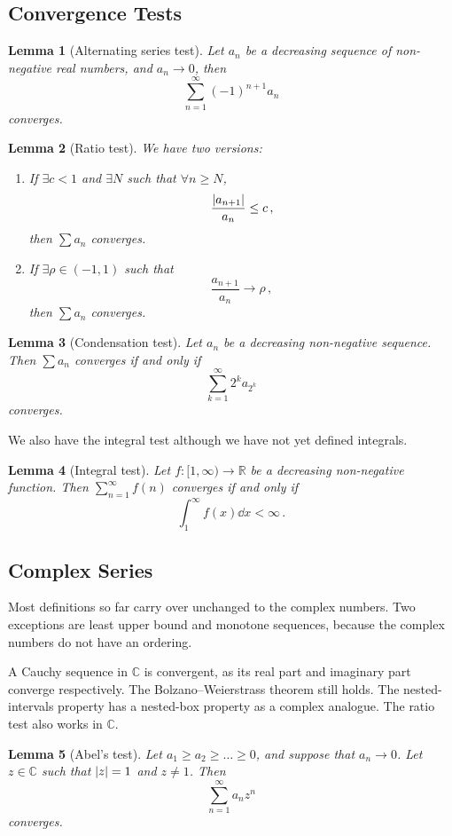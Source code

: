 \documentclass{article}
\theoremstyle{plain}\theoremheaderfont{\normalfont\itshape}\theorembodyfont{\rmfamily}\theoremseparator{.}\newtheorem*{rem}{Remark}\newtheorem*{ex}{Example}\newtheorem*{proof}{Proof}\newtheorem*{altp}{Alternative proof}
\theoremstyle{plain}\theoremheaderfont{\normalfont\bfseries}\theorembodyfont{\rmfamily}\theoremseparator{.}\newtheorem{thm}{Theorem}[section]\newtheorem{lem}[thm]{Lemma}\newtheorem{prop}[thm]{Proposition}\newtheorem*{cor}{Corollary}\newtheorem{defn}[thm]{Definition}\newtheorem{clm}[thm]{Claim}\newtheorem{clminproof}{Claim}
\theoremstyle{break}\theoremheaderfont{\normalfont\itshape}\theorembodyfont{\rmfamily}\theoremseparator{.\medskip}\newtheorem*{proofskip}{Proof}\newtheorem*{exs}{Examples}\newtheorem*{rems}{Remarks}
\theoremstyle{break}\theoremheaderfont{\normalfont\bfseries}\theorembodyfont{\rmfamily}\theoremseparator{.\medskip}\newtheorem{lemskip}[thm]{Lemma}\newtheorem{defnskip}[thm]{Definition}\newtheorem{propskip}[thm]{Proposition}\newtheorem{thmskip}[thm]{Theorem}
\begin{document}
    \subsection{Convergence Tests}
    \begin{lem}[Alternating series test]
        Let \(a_n\) be a decreasing sequence of non-negative real numbers, and \(a_n\to 0\), then
        \[\sum_{n=1}^{\infty}(-1)^{n+1}a_n\]
        converges.
    \end{lem}
    \begin{lem}[Ratio test]
        We have two versions:
        \begin{enumerate}[topsep=0pt,label=(\roman*)]
            \item If \(\exists c<1\) and \(\exists N\) such that \(\forall n\ge N\),
            \[\frac{\abs{a_{n+1}}}{a_n}\le c\,,\]
            then \(\sum a_n\) converges.
            \item If \(\exists\rho\in(-1,1)\) such that
            \[\frac{a_{n+1}}{a_n}\to\rho\,,\]
            then \(\sum a_n\) converges.
        \end{enumerate}
    \end{lem}
    \begin{lem}[Condensation test]
        Let \(a_n\) be a decreasing non-negative sequence. Then \(\sum a_n\) converges if and only if
        \[\sum_{k=1}^{\infty}2^k a_{2^k}\]
        converges. 
    \end{lem}
    We also have the integral test although we have not yet defined integrals.
    \begin{lem}[Integral test]
        Let \(f:[1,\infty)\to\mathbb{R}\) be a decreasing non-negative function. Then \(\sum_{n=1}^{\infty}f(n)\) converges if and only if
        \[\int_{1}^{\infty}f(x)\dd{x}<\infty\,.\]
    \end{lem}
    \subsection{Complex Series}
    Most definitions so far carry over unchanged to the complex numbers. Two exceptions are least upper bound and monotone sequences, because the complex numbers do not have an ordering.
    
    A Cauchy sequence in \(\mathbb{C}\) is convergent, as its real part and imaginary part converge respectively. The Bolzano--Weierstrass theorem still holds. The nested-intervals property has a nested-box property as a complex analogue. The ratio test also works in \(\mathbb{C}\).
    \begin{lem}[Abel's test]
        Let \(a_1\ge a_2\ge\dots\ge 0\), and suppose that \(a_n\to 0\). Let \(z\in\mathbb{C}\) such that \(\abs{z}=1\) and \(z\ne 1\). Then
        \[\sum_{n=1}^{\infty}a_n z^n\]
        converges.
    \end{lem}
\end{document}
